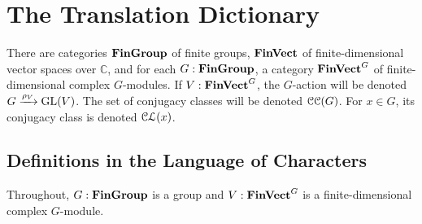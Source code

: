 \section{The Translation Dictionary} \label{sec:translation} %
\pan There are categories $\operatorname{\mathbf{FinGroup}}$ of finite groups, $\operatorname{\mathbf{FinVect}}$ of finite-dimensional vector spaces over $\mathbb{C}$, and for each $G : \operatorname{\mathbf{FinGroup}}$, a category $\operatorname{\mathbf{FinVect}}^G$ of finite-dimensional complex $G$-modules. If $V : \operatorname{\mathbf{FinVect}}^G$, the $G$-action will be denoted $G \xrightarrow{\rho_V} \operatorname{GL}(V)$. The set of conjugacy classes will be denoted $\operatorname{\mathcal{CC}}(G)$. For $x \in G$, its conjugacy class is denoted $\operatorname{\mathcal{CL}}(x)$.

\skoop

\subsection{Definitions in the Language of Characters} %
\pan Throughout, $G : \operatorname{\mathbf{FinGroup}}$ is a group and $V : \operatorname{\mathbf{FinVect}}^G$ is a finite-dimensional complex $G$-module. 
